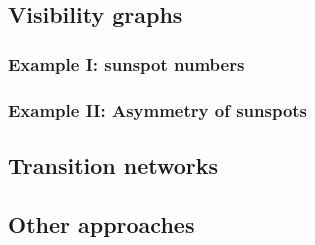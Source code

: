 	\subsection{Visibility graphs}
		\subsubsection{Example I: sunspot numbers}
		\subsubsection{Example II: Asymmetry of sunspots}

	\subsection{Transition networks}
	\subsection{Other approaches}

